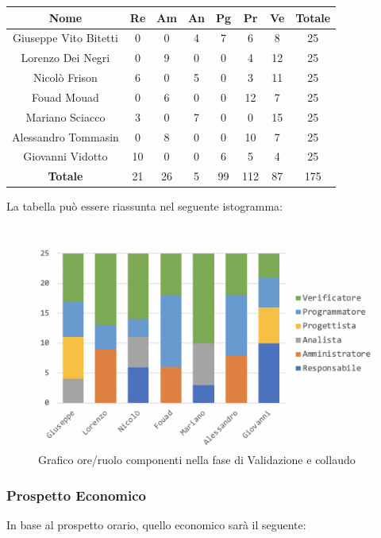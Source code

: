 		\begin{longtable}{|c|c|c|c|c|c|c|c}
			\hline
			\rowcolor{lighter-grayer}
			\textbf{Nome} & \textbf{Re} & \textbf{Am} & \textbf{An} & \textbf{Pg}  & \textbf{Pr}   & \textbf{Ve} & \textbf{Totale} \\
			\hline
			\endfirsthead
			
			\hline
			Giuseppe Vito Bitetti 		& 0 & 0 & 4 & 7 & 6 & 8 & 25\\
			\hline
			\hline
			Lorenzo Dei Negri			& 0 & 9 & 0 & 0 & 4 & 12 & 25\\
			\hline
			\hline
			Nicolò Frison				    & 6 & 0 & 5 & 0 & 3 & 11 & 25\\
			\hline
			\hline
			Fouad Mouad 				 & 0 & 6 & 0 & 0 & 12 & 7 & 25\\
			\hline
			\hline
			Mariano Sciacco 			& 3 & 0 & 7 & 0 & 0 & 15 & 25\\
			\hline
			\hline
			Alessandro Tommasin    & 0 & 8 & 0 & 0 & 10 & 7 & 25\\
			\hline
			\hline
			Giovanni Vidotto 			 & 10 & 0 & 0 & 6 & 5 & 4 & 25\\
			\hline 
			\textbf{Totale}			 & 21 &  26 & 5 & 99 & 112 & 87 & 175\\
			\hline
		\end{longtable}
		\pagebreak
		
		La tabella può essere riassunta nel seguente istogramma:
		\begin{figure}[H]
			\centering
			\includegraphics[width=0.8\linewidth]{./images/validColl1.png}
			\caption{Grafico ore/ruolo componenti nella fase di Validazione e collaudo}
			\label{fig:grafico suddivione ruoli fase Validazione e collaudo}
		\end{figure}
	
		\subsubsection{Prospetto Economico}
		In base al prospetto orario, quello economico sarà il seguente: 
		
